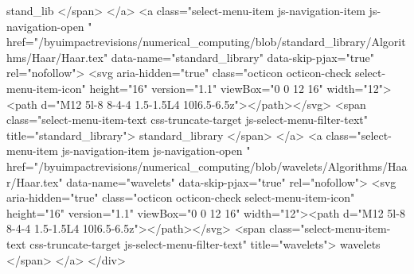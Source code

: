                stand_lib
              </span>
            </a>
            <a class="select-menu-item js-navigation-item js-navigation-open "
               href="/byuimpactrevisions/numerical_computing/blob/standard_library/Algorithms/Haar/Haar.tex"
               data-name="standard_library"
               data-skip-pjax="true"
               rel="nofollow">
              <svg aria-hidden="true" class="octicon octicon-check select-menu-item-icon" height="16" version="1.1" viewBox="0 0 12 16" width="12"><path d="M12 5l-8 8-4-4 1.5-1.5L4 10l6.5-6.5z"></path></svg>
              <span class="select-menu-item-text css-truncate-target js-select-menu-filter-text" title="standard_library">
                standard_library
              </span>
            </a>
            <a class="select-menu-item js-navigation-item js-navigation-open "
               href="/byuimpactrevisions/numerical_computing/blob/wavelets/Algorithms/Haar/Haar.tex"
               data-name="wavelets"
               data-skip-pjax="true"
               rel="nofollow">
              <svg aria-hidden="true" class="octicon octicon-check select-menu-item-icon" height="16" version="1.1" viewBox="0 0 12 16" width="12"><path d="M12 5l-8 8-4-4 1.5-1.5L4 10l6.5-6.5z"></path></svg>
              <span class="select-menu-item-text css-truncate-target js-select-menu-filter-text" title="wavelets">
                wavelets
              </span>
            </a>
        </div>

